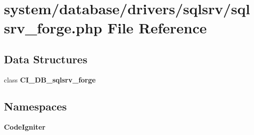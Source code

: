 \section{system/database/drivers/sqlsrv/sqlsrv\-\_\-forge.php File Reference}
\label{sqlsrv__forge_8php}
\subsection*{Data Structures}
\begin{DoxyCompactItemize}
\item 
class {\bf C\-I\-\_\-\-D\-B\-\_\-sqlsrv\-\_\-forge}
\end{DoxyCompactItemize}
\subsection*{Namespaces}
\begin{DoxyCompactItemize}
\item 
{\bf Code\-Igniter}
\end{DoxyCompactItemize}
